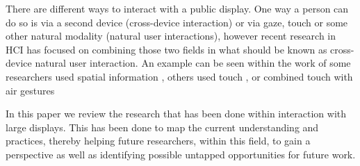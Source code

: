 There are different ways to interact with a public display. One way a person can do so is via a second device (cross-device interaction) or via gaze, touch or some other natural modality (natural user interactions), however recent research in HCI has focused on combining those two fields in what should be known as cross-device natural user interaction. An example can be seen within the work of some researchers used spatial information \cite{Marquardt:2011, Marquardt:2012}, others used touch \cite{Seifert:2012}, or combined touch with air gestures \cite{Bragton:2011}

In this paper we review the research that has been done within interaction with large displays. 
This has been done to map the current understanding and practices, thereby helping future researchers, within this field, to gain a perspective as well as identifying possible untapped opportunities for future work.
